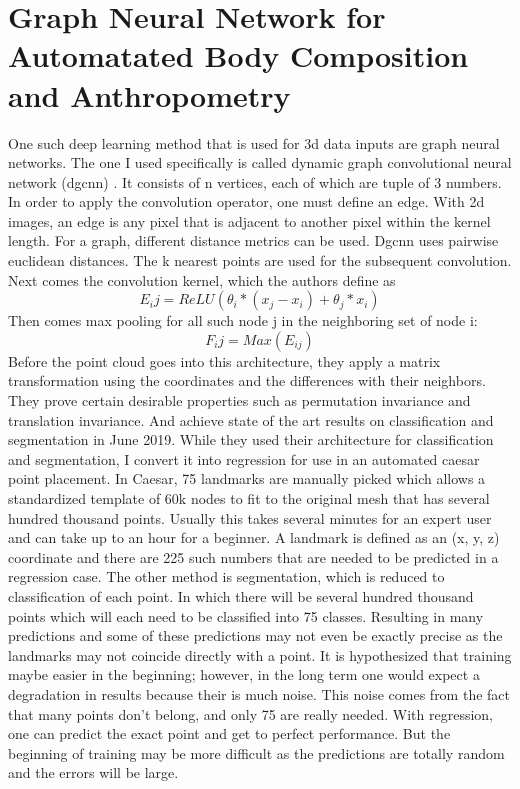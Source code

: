 \section{Graph Neural Network for Automatated Body Composition and Anthropometry}
One such deep learning method that is used for 3d data inputs are graph neural networks. The one I used specifically is called dynamic graph convolutional neural network (dgcnn) \cite{DBLP:journals/corr/abs-1801-07829}. It consists of n vertices, each of which are tuple of 3 numbers. In order to apply the convolution operator, one must define an edge. With 2d images, an edge is any pixel that is adjacent to another pixel within the kernel length. For a graph, different distance metrics can be used. Dgcnn uses pairwise euclidean distances. The k nearest points are used for the subsequent convolution. Next comes the convolution kernel, which the authors define as
\begin{equation}
	E_ij = ReLU(\theta_i * (x_j - x_i) + \theta_j * x_i)
\end{equation}
Then comes max pooling for all such node j in the neighboring set of node i:
\begin{equation}
F_ij = Max(E_{ij})
\end{equation}
Before the point cloud goes into this architecture, they apply a matrix transformation using the coordinates and the differences with their neighbors.
They prove certain desirable properties such as permutation invariance and translation invariance. And achieve state of the art results on classification and segmentation in June 2019.
While they used their architecture for classification and segmentation, I convert it into regression for use in an automated caesar point placement. In Caesar, 75 landmarks are manually picked which allows a standardized template of 60k nodes to fit to the original mesh that has several hundred thousand points. Usually this takes several minutes for an expert user and can take up to an hour for a beginner.
A landmark is defined as an (x, y, z) coordinate and there are 225 such numbers that are needed to be predicted in a regression case. The other method is segmentation, which is reduced to classification of each point. In which there will be several hundred thousand points which will each need to be classified into 75 classes. Resulting in many predictions and some of these predictions may not even be exactly precise as the landmarks may not coincide directly with a point. It is hypothesized that training maybe easier in the beginning; however, in the long term one would expect a degradation in results because their is much noise. This noise comes from the fact that many points don't belong, and only 75 are really needed. With regression, one can predict the exact point and get to perfect performance. But the beginning of training may be more difficult as the predictions are totally random and the errors will be large.
